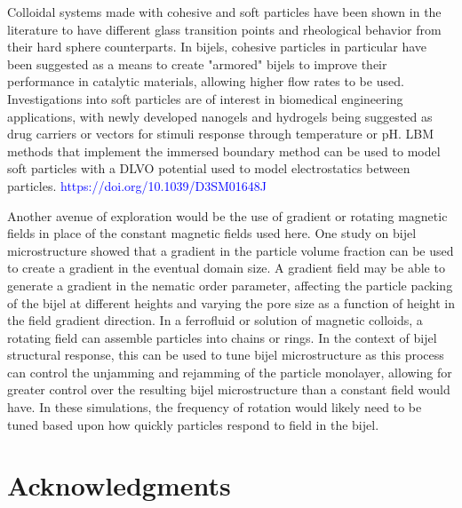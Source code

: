 Colloidal systems made with cohesive and soft particles have been shown in the literature to have different glass 
transition points and rheological behavior from their hard sphere counterparts. In bijels, cohesive particles in 
particular have been suggested as a means to create "armored" bijels to improve their performance in catalytic materials, 
allowing higher flow rates to be used. Investigations into soft particles are of interest in biomedical engineering 
applications, with newly developed nanogels and hydrogels being suggested as drug carriers or vectors for stimuli 
response through temperature or pH. LBM methods that implement the immersed boundary method can be used to model soft
particles with a DLVO potential used to model electrostatics between particles. \textcolor{blue}{https://doi.org/10.1039/D3SM01648J}

Another avenue of exploration would be the use of gradient or rotating magnetic fields in place of the constant magnetic 
fields used here. One study on bijel microstructure showed that a gradient in the particle volume fraction can be used to 
create a gradient in the eventual domain size. A gradient field may be able to generate a gradient in the nematic order 
parameter, affecting the particle packing of the bijel at different heights and varying the pore size as a function of 
height in the field gradient direction. In a ferrofluid or solution of magnetic colloids, a rotating field can assemble 
particles into chains or rings. In the context of bijel structural response, this can be used to tune bijel microstructure 
as this process can control the unjamming and rejamming of the particle monolayer, allowing for greater control over the 
resulting bijel microstructure than a constant field would have. In these simulations, the frequency of rotation would 
likely need to be tuned based upon how quickly particles respond to field in the bijel.



\section{Acknowledgments}

